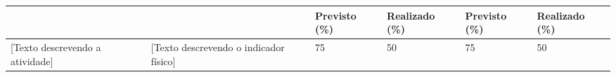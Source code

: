 \begin{table}[h]
{\begin{tabular}{| p{4.05cm} | p{4.5cm} | p{1.5cm} | p{1.5cm} | p{1.5cm} | p{1.5cm} |}
    \rowcolor{lightgray}
    & & \textbf{Previsto (\%)} & \textbf{Realizado (\%)} & \textbf{Previsto (\%)} & \textbf{Realizado (\%)} \\ \hline

    [Texto descrevendo a atividade] & [Texto descrevendo o indicador físico] & 75 & 50 & 75 & 50 \\ \hline
\end{tabular}}
\end{table}